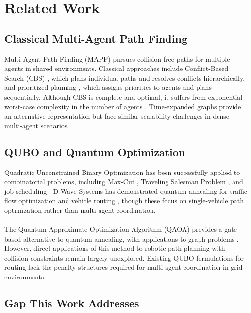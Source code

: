 \documentclass[11pt]{article}
\begin{document}
\section{Related Work}

\subsection{Classical Multi-Agent Path Finding}

Multi-Agent Path Finding (MAPF) pursues collision-free paths for multiple agents in shared environments. Classical approaches include Conflict-Based Search (CBS) \cite{SHARON2015_CBS}, which plans individual paths and resolves conflicts hierarchically, and prioritized planning \cite{cap2014prioritizedplanningalgorithmstrajectory}, which assigns priorities to agents and plans sequentially. Although CBS is complete and optimal, it suffers from exponential worst-case complexity in the number of agents \cite{mapf}. Time-expanded graphs \cite{Yu_LaValle_2013} provide an alternative representation but face similar scalability challenges in dense multi-agent scenarios.

\subsection{QUBO and Quantum Optimization}

Quadratic Unconstrained Binary Optimization has been successfully applied to combinatorial problems, including Max-Cut \cite{rehfeldt2022fasterexactsolutionsparse}, Traveling Salesman Problem \cite{lucas2014ising}, and job scheduling \cite{venturelli2016job}. D-Wave Systems has demonstrated quantum annealing for traffic flow optimization \cite{neukart2017traffic} and vehicle routing \cite{Feld_2019}, though these focus on single-vehicle path optimization rather than multi-agent coordination.\\
\\
The Quantum Approximate Optimization Algorithm (QAOA) \cite{farhi2014quantumapproximateoptimizationalgorithm} provides a gate-based alternative to quantum annealing, with applications to graph problems \cite{Zhou_2020}. However, direct applications of this method to robotic path planning with collision constraints remain largely unexplored. Existing QUBO formulations for routing lack the penalty structures required for multi-agent coordination in grid environments.

\subsection{Gap This Work Addresses}
\end{document}
